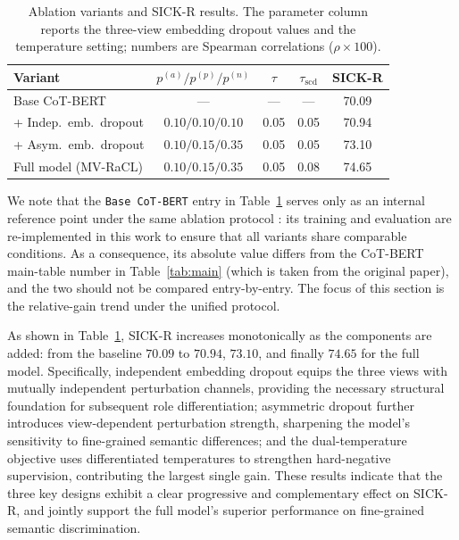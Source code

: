 \documentclass[a4paper,fleqn]{cas-dc}
\begin{document}
\begin{table}[t]
\centering
\caption{Ablation variants and SICK-R results. The parameter column reports the three-view embedding dropout values and the temperature setting; numbers are Spearman correlations ($\rho \times 100$).}
\label{tab:ablation}
\small
\setlength{\tabcolsep}{4pt}
\begin{tabular*}{\tblwidth}{@{\extracolsep{\fill}}lcccc@{}}
\toprule
Variant & $p^{(a)}/p^{(p)}/p^{(n)}$ & $\tau$ & $\tau_{\mathrm{scd}}$ & SICK-R \\
\midrule
Base CoT-BERT                & ---              & ---  & ---  & 70.09 \\
+ Indep.\ emb.\ dropout      & $0.10/0.10/0.10$ & 0.05 & 0.05 & 70.94 \\
+ Asym.\ emb.\ dropout       & $0.10/0.15/0.35$ & 0.05 & 0.05 & 73.10 \\
Full model (MV-RaCL)         & $0.10/0.15/0.35$ & 0.05 & 0.08 & 74.65 \\
\bottomrule
\end{tabular*}
\end{table}

We note that the \texttt{Base CoT-BERT} entry in Table~\ref{tab:ablation} serves only as an internal reference point under the same ablation protocol : its training and evaluation are re-implemented in this work to ensure that all variants share comparable conditions. As a consequence, its absolute value differs from the CoT-BERT main-table number in Table~\ref{tab:main} (which is taken from the original paper), and the two should not be compared entry-by-entry. The focus of this section is the relative-gain trend under the unified protocol.

As shown in Table~\ref{tab:ablation}, SICK-R increases monotonically as the components are added: from the baseline $70.09$ to $70.94$, $73.10$, and finally $74.65$ for the full model. Specifically, independent embedding dropout equips the three views with mutually independent perturbation channels, providing the necessary structural foundation for subsequent role differentiation; asymmetric dropout further introduces view-dependent perturbation strength, sharpening the model's sensitivity to fine-grained semantic differences; and the dual-temperature objective uses differentiated temperatures to strengthen hard-negative supervision, contributing the largest single gain. These results indicate that the three key designs exhibit a clear progressive and complementary effect on SICK-R, and jointly support the full model's superior performance on fine-grained semantic discrimination.
\end{document}
